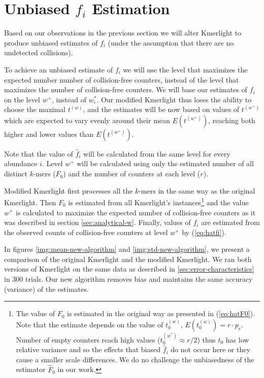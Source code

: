 \section{Unbiased $f_i$ Estimation}
\label{sec:unbiased-estimate}

Based on our observations in the previous section we will alter Kmerlight 
to produce unbiased estimates of $f_i$ (under the assumption that there are no undetected
collisions).

To achieve an unbiased estimate of $f_i$ we will use the level that maximizes the
expected number number of collision-free counters, instead of the level that maximizes the number
of collision-free counters. We will base our estimates of $f_i$ on the level $w^+$, 
instead of $w_i^*$. Our modified Kmerlight thus loses the ability to choose the maximal 
$t^{(w)}$, and the estimates will be now based on values of $t^{(w^+)}$ which
are expected to vary evenly around their mean $E(t^{(w^+)})$, reaching both higher
and lower values than $E(t^{(w^+)})$.

Note that the value of $\hat f_i$ will be calculated from the same level for every abundance $i$.
Level $w^+$ will be calculated using only the estimated number of all distinct $k$-mers ($F_0$)
and the number of counters at each level ($r$).

Modified Kmerlight first processes all the $k$-mers in the same
way as the original Kmerlight. Then $F_0$ is estimated from all Kmerlight's instances\footnote{
The value of $F_0$ is estimated in the original way as presented in (\ref{eq:hatF0}).
Note that the estimate depends on the value of $t_0^{(w)}$, $E(t_0^{(w)}) = r \cdot p_e$. 
Number of empty counters reach high values ($t_0^{(w^*)} \approx r/2$) thus $t_0$ has low
relative variance and so the effects that biased $\hat f_i$ do not occur here or they cause 
a smaller scale differences. We do no challenge the unbiasedness of the estimator $\hat F_0$
in our work.
}
and the value $w^+$ is calculated to maximize the expected number of
collision-free counters as it was described in section \ref{sec:analytical-w}.
Finally, values of $f_i$ are estimated from the observed counts of 
collision-free counters at level $w^+$ by (\ref{eq:hatfi}).

In figures \ref{img:mean-new-algorithm} and \ref{img:std-new-algorithm}, we present a comparison
of the original Kmerlight and the modified Kmerlight. We ran both versions of Kmerlight
on the same data as described in \ref{sec:error-characteristics} in 300 trials. 
Our new algorithm removes bias and maintains the same accuracy (variance) of the estimates.

